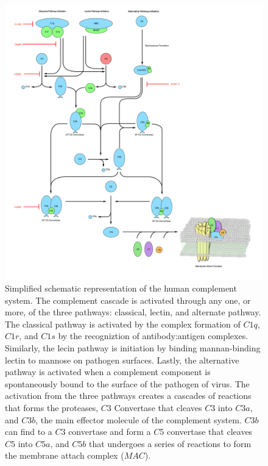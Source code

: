 \documentclass[12pt]{article}
\begin{document}
\begin{figure}[h]
\centering
\includegraphics[width=1.0\textwidth]{./Figures/ComplementSystemSchematic_v2.pdf}
\caption{Simplified schematic representation of the human complement system. The complement cascade is activated through any one, or more, of the three pathways: classical, lectin, and alternate pathway. The classical pathway is activated by the complex formation of $C1q$, $C1r$, and $C1s$ by the recogniztion of antibody:antigen complexes. Similarly, the lecin pathway is initiation by binding mannan-binding lectin to mannose on pathogen surfaces. Lastly, the alternative pathway is activated when a complement component is spontaneously bound to the surface of the pathogen of virus. The activation from the three pathways creates a cascades of reactions that forms the proteases, $C3$ Convertase that cleaves $C3$ into $C3a$, and $C3b$, the main effector molecule of the complement system. $C3b$ can find to a $C3$ convertase and form a $C5$ convertase that cleaves $C5$ into $C5a$, and $C5b$ that undergoes a series of reactions to form the membrane attach complex ($MAC$).}
\label{fig-schematic}
\end{figure}
\end{document}
